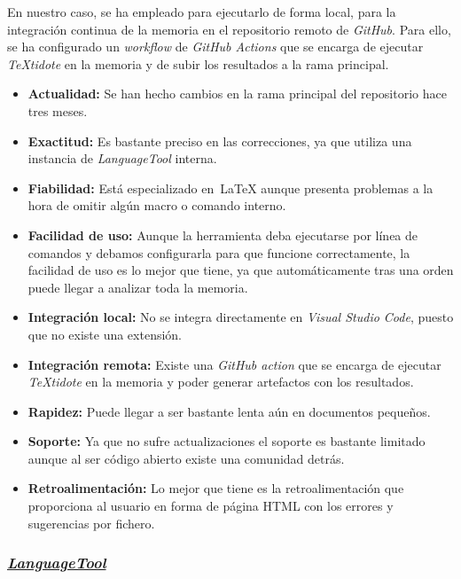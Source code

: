 En nuestro caso, se ha empleado para ejecutarlo de forma local, para la integración continua de la memoria en el repositorio remoto de \textit{GitHub}. Para ello, se ha configurado un \textit{workflow} de \textit{GitHub Actions} que se encarga de ejecutar \textit{TeXtidote} en la memoria y de subir los resultados a la rama principal.

\begin{itemize}
    \item[\bien] \textbf{Actualidad:}  Se han hecho cambios en la rama principal del repositorio hace tres meses.
    \item[\bien] \textbf{Exactitud:} Es bastante preciso en las correcciones, ya que utiliza una instancia de \textit{LanguageTool} interna.
    \item[\regular] \textbf{Fiabilidad:} Está especializado en~\LaTeX{} aunque presenta problemas a la hora de omitir algún macro o comando interno.
    \item[\esp] \textbf{Facilidad de uso:} Aunque la herramienta deba ejecutarse por línea de comandos y debamos configurarla para que funcione correctamente, la facilidad de uso es lo mejor que tiene, ya que automáticamente tras una orden puede llegar a analizar toda la memoria.
    \item[\mal] \textbf{Integración local:} No se integra directamente en \textit{Visual Studio Code}, puesto que no existe una extensión.
    \item[\bien] \textbf{Integración remota:} Existe una \textit{GitHub action} que se encarga de ejecutar \textit{TeXtidote} en la memoria y poder generar artefactos con los resultados. 
    \item[\regular] \textbf{Rapidez:} Puede llegar a ser bastante lenta aún en documentos pequeños.
    \item[\regular] \textbf{Soporte:} Ya que no sufre actualizaciones el soporte es bastante limitado aunque al ser código abierto existe una comunidad detrás.
    \item[\bien] \textbf{Retroalimentación:} Lo mejor que tiene es la retroalimentación que proporciona al usuario en forma de página HTML con los errores y sugerencias por fichero.
\end{itemize}

\subsubsection{\href{https://github.com/languagetool-org/languagetool}{\textit{LanguageTool}}}\label{sec:languagetool}

